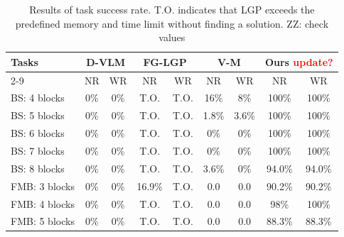 \documentclass[letterpaper, 10 pt, conference]{ieeeconf}  %
\newcommand{\zz}[1]{{\color{red}ZZ: #1}}
\begin{document}
\begin{table}[t]
\centering
\footnotesize
\setlength{\tabcolsep}{3pt}
\caption{Results of task success rate. T.O. indicates that LGP exceeds the predefined memory and time limit without finding a solution. \zz{check values}}
\label{tab:planning_sr}
\begin{tabular}{l|cccccccc}
\toprule
\multirow{2}{*}{Tasks} & \multicolumn{2}{c}{D-VLM} & \multicolumn{2}{c}{FG-LGP} & \multicolumn{2}{c}{V-M} & \multicolumn{2}{c}{Ours \textcolor{red}{update?}}\\
\cmidrule{2-9} & NR & WR & NR & WR & NR & WR & NR & WR \\
\midrule
BS: 4 blocks  & 0\% &  0\% & T.O. & T.O. & 16\% & 8\% & 100\% & 100\%\\
BS: 5 blocks &  0\% &  0\% & T.O. & T.O. & 1.8\% & 3.6\% & 100\% & 100\%  \\
BS: 6 blocks &  0\% &  0\% & T.O. & T.O. & 0\% & 0\% & 100\% & 100\% \\
BS: 7 blocks & 0\% & 0\% & T.O. & T.O. & 0\% & 0\% & 100\% & 100\%  \\
BS: 8 blocks &  0\% & 0\% & T.O. & T.O. & 3.6\% & 0\% & 94.0\% & 94.0\% \\
\midrule
FMB: 3 blocks & 0\% & 0\% & 16.9\% & T.O. & 0.0 & 0.0 & 90.2\%  & 90.2\%   \\
FMB: 4 blocks  & 0\% & 0\% & T.O. & T.O. & 0.0 & 0.0 & 98\%  & 100\%  \\
FMB: 5 blocks & 0\% & 0\% &  T.O. & T.O. & 0.0 & 0.0  & 88.3\%  & 88.3\%  \\
\bottomrule
\end{tabular}
\vspace{-2mm}
\end{table}
\end{document}
